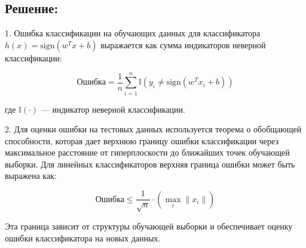 \subsection*{Решение:}

1. Ошибка классификации на обучающих данных для классификатора \( h(x) = \text{sign}(w^T x + b) \) выражается как сумма индикаторов неверной классификации:

   \[
   \text{Ошибка} = \frac{1}{n} \sum_{i=1}^{n} \mathbb{I}(y_i \neq \text{sign}(w^T x_i + b))
   \]

   где \( \mathbb{I}(\cdot) \) — индикатор неверной классификации.

2. Для оценки ошибки на тестовых данных используется теорема о обобщающей способности, которая дает верхнюю границу ошибки классификации через максимальное расстояние от гиперплоскости до ближайших точек обучающей выборки. Для линейных классификаторов верхняя граница ошибки может быть выражена как:

   \[
   \text{Ошибка} \leq \frac{1}{\sqrt{n}} \cdot \left( \max_{i} \| x_i \| \right)
   \]

   Эта граница зависит от структуры обучающей выборки и обеспечивает оценку ошибки классификатора на новых данных.
   
